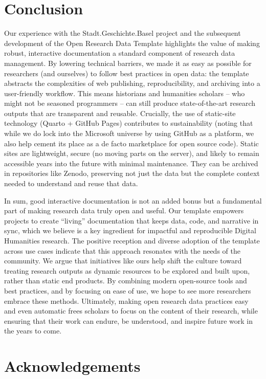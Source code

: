 \documentclass{anthology-ch}         %
\begin{document}
\section{Conclusion}\label{conclusion}

Our experience with the Stadt.Geschichte.Basel project and the subsequent development of the Open Research Data Template highlights the value of making robust, interactive documentation a standard component of research data management. By lowering technical barriers, we made it as easy as possible for researchers (and ourselves) to follow best practices in open data: the template abstracts the complexities of web publishing, reproducibility, and archiving into a user-friendly workflow. This means historians and humanities scholars -- who might not be seasoned programmers -- can still produce state-of-the-art research outputs that are transparent and reusable. Crucially, the use of static-site technology (Quarto + GitHub Pages) contributes to sustainability (noting that while we do lock into the Microsoft universe by using GitHub as a platform, we also help cement its place as a de facto marketplace for open source code). Static sites are lightweight, secure (no moving parts on the server), and likely to remain accessible years into the future with minimal maintenance. They can be archived in repositories like Zenodo, preserving not just the data but the complete context needed to understand and reuse that data.

In sum, good interactive documentation is not an added bonus but a fundamental part of making research data truly open and useful. Our template empowers projects to create ``living'' documentation that keeps data, code, and narrative in sync, which we believe is a key ingredient for impactful and reproducible Digital Humanities research. The positive reception and diverse adoption of the template across use cases indicate that this approach resonates with the needs of the community. We argue that initiatives like ours help shift the culture toward treating research outputs as dynamic resources to be explored and built upon, rather than static end products. By combining modern open-source tools and best practices, and by focusing on ease of use, we hope to see more researchers embrace these methods. Ultimately, making open research data practices easy and even automatic frees scholars to focus on the content of their research, while ensuring that their work can endure, be understood, and inspire future work in the years to come.

\section*{Acknowledgements}
\end{document}
